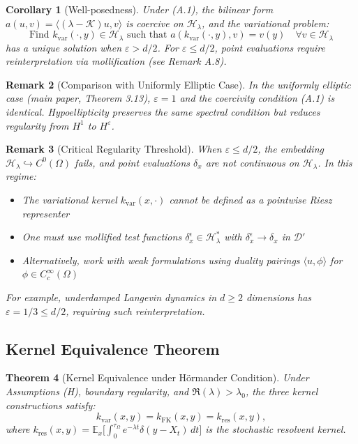 \documentclass[11pt,a4paper]{article}
\newtheorem{theorem}{Theorem}[section]
\newtheorem{corollary}[theorem]{Corollary}
\newtheorem{remark}[theorem]{Remark}
\begin{document}
\begin{corollary}[Well-posedness]
Under (A.1), the bilinear form $a(u,v) = \langle (\lambda - \mathcal{K})u, v\rangle$ is coercive on $\mathcal{H}_\lambda$, and the variational problem:
\[
\text{Find } k_{\mathrm{var}}(\cdot,y) \in \mathcal{H}_\lambda \text{ such that }
a(k_{\mathrm{var}}(\cdot,y), v) = v(y) \quad \forall v \in \mathcal{H}_\lambda
\]
has a unique solution when $\varepsilon > d/2$. For $\varepsilon \leq d/2$, point evaluations require reinterpretation via mollification (see Remark A.8).
\end{corollary}

\begin{remark}[Comparison with Uniformly Elliptic Case]
In the uniformly elliptic case (main paper, Theorem 3.13), $\varepsilon = 1$ and the coercivity condition (A.1) is identical. Hypoellipticity preserves the same spectral condition but reduces regularity from $H^1$ to $H^\varepsilon$.
\end{remark}

\begin{remark}[Critical Regularity Threshold]
When $\varepsilon \leq d/2$, the embedding $\mathcal{H}_\lambda \hookrightarrow C^0(\Omega)$ fails, and point evaluations $\delta_x$ are \emph{not continuous} on $\mathcal{H}_\lambda$. In this regime:
\begin{itemize}
    \item The variational kernel $k_{\mathrm{var}}(x,\cdot)$ cannot be defined as a pointwise Riesz representer
    \item One must use mollified test functions $\delta_x^\epsilon \in \mathcal{H}_\lambda^*$ with $\delta_x^\epsilon \to \delta_x$ in $\mathcal{D}'$
    \item Alternatively, work with weak formulations using duality pairings $\langle u, \phi \rangle$ for $\phi \in C_c^\infty(\Omega)$
\end{itemize}
For example, underdamped Langevin dynamics in $d \geq 2$ dimensions has $\varepsilon = 1/3 \leq d/2$, requiring such reinterpretation.
\end{remark}

\subsection{Kernel Equivalence Theorem}

\begin{theorem}[Kernel Equivalence under H\"{o}rmander Condition]
Under Assumptions (H), boundary regularity, and $\Re(\lambda) > \lambda_0$, the three kernel constructions satisfy:
\[
k_{\mathrm{var}}(x,y) = k_{\mathrm{FK}}(x,y) = k_{\mathrm{res}}(x,y),
\]
where $k_{\mathrm{res}}(x,y) = \mathbb{E}_x\bigl[\int_0^{\tau_\Omega} e^{-\lambda t}\delta(y - X_t)\,dt\bigr]$ is the stochastic resolvent kernel.
\end{theorem}
\end{document}
